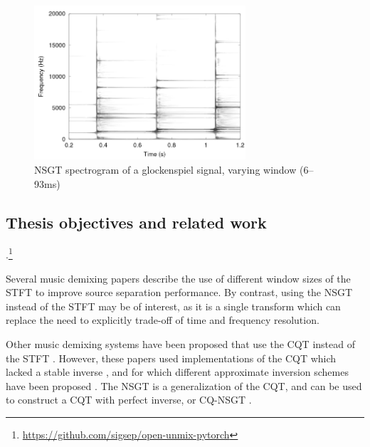 \documentclass[report.tex]{subfiles}
\begin{document}
\begin{figure}[ht]
	\centering
	\includegraphics[width=0.7\textwidth]{./images-tftheory/tf_tradeoff_balasz3.png}
	\caption{NSGT spectrogram of a glockenspiel signal, varying window (6--93ms) \parencite[4]{jaillet}}
	\label{fig:nsgttradeoff}
\end{figure}

\subsection{Thesis objectives and related work}

 \parencite{umx} .\footnote{\url{https://github.com/sigsep/open-unmix-pytorch}} 

Several music demixing papers \parencite{fitzgerald1, driedger, tftradeoff1, tftradeoff2} describe the use of different window sizes of the STFT to improve source separation performance. By contrast, using the NSGT instead of the STFT may be of interest, as it is a single transform which can replace the need to explicitly trade-off of time and frequency resolution.

Other music demixing systems have been proposed that use the CQT instead of the STFT \parencite{fitzgerald2, cqtseparation, bettermusicsep}. However, these papers used implementations of the CQT which lacked a stable inverse \parencite{lackinverse}, and for which different approximate inversion schemes have been proposed \parencite{klapuricqt, fitzgeraldcqt}. The NSGT is a generalization of the CQT, and can be used to construct a CQT with perfect inverse, or CQ-NSGT \parencite{invertiblecqt, variableq1}.
\end{document}
